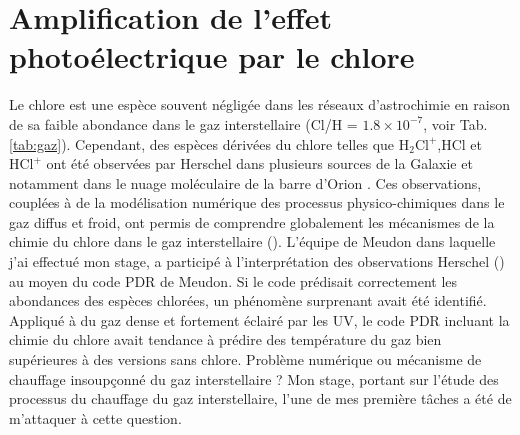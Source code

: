 


\section{Amplification de l'effet photoélectrique par le chlore}





Le chlore est une espèce souvent négligée dans les réseaux d'astrochimie en raison de sa faible abondance dans le gaz interstellaire (Cl/H = $1.8\times10^{-7}$, voir Tab. \ref{tab:gaz}). Cependant, des espèces dérivées du chlore telles que $\mathrm{H}_2\mathrm{Cl}^+$,HCl et $\mathrm{HCl}^+$ ont été observées par Herschel dans plusieurs sources de la Galaxie et notamment dans le nuage moléculaire de la barre d'Orion \cite{Neufeld2012, Neufire2009, Schilke}. Ces observations, couplées à de la modélisation numérique des processus physico-chimiques dans le gaz diffus et froid, ont permis de comprendre globalement les mécanismes de la chimie du chlore dans le gaz interstellaire (\cite{Neufire2009,Amin,Schilke}). L'équipe de Meudon dans laquelle j'ai effectué mon stage, a participé à l'interprétation des observations Herschel (\cite{Neufeld2012}) au moyen du code PDR de Meudon. Si le code prédisait correctement les abondances des espèces chlorées, un phénomène surprenant avait été identifié. Appliqué à du gaz dense et fortement éclairé par les UV, le code PDR incluant la chimie du chlore avait tendance à prédire des température du gaz bien supérieures à des versions sans chlore. Problème numérique ou mécanisme de chauffage insoupçonné du gaz interstellaire ? Mon stage, portant sur l'étude des processus du chauffage du gaz interstellaire, l'une de mes première tâches a été de m'attaquer à cette question. 



